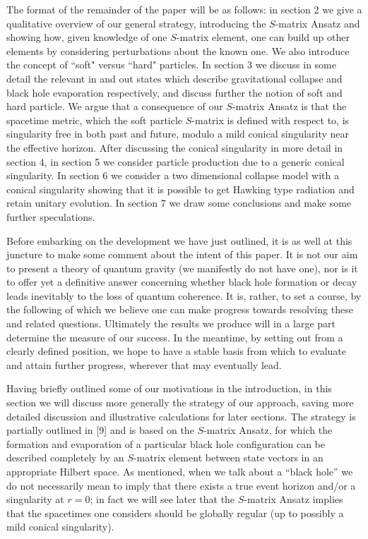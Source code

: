 The format of the remainder of the paper will be as follows: in section
2 we give a qualitative overview of our general strategy, introducing
the $S$-matrix Ansatz and showing how, given knowledge of one
$S$-matrix element, one can build up other elements by considering
perturbations about the known one. We also introduce the concept of
``soft" versus ``hard" particles. In section 3 we discuss in some
detail the relevant in and out states which describe gravitational
collapse and black hole evaporation respectively, and discuss further
the notion of soft and hard particle. We argue that a consequence of
our $S$-matrix Ansatz is that the spacetime metric, which the soft
particle $S$-matrix is defined with respect to, is singularity free in
both past and future, modulo a mild conical singularity near the
effective horizon.  After discussing the conical singularity in more
detail in section 4, in section 5 we consider particle production due
to a generic conical singularity. In section 6 we consider a two
dimensional collapse model with a conical singularity showing that it
is possible to get Hawking type radiation and retain unitary evolution.
In section 7 we draw some conclusions and make some further
speculations.

Before embarking on the development we have just outlined, it is as
well at this juncture to make some comment about the intent of this
paper. It is not our aim to present a theory of quantum gravity (we
manifestly do not have one), nor is it to offer yet a definitive answer
concerning whether black hole formation or decay leads inevitably to
the loss of quantum coherence.  It is, rather, to set a course, by the
following of which we believe one can make progress towards resolving
these and related questions. Ultimately the results we produce will in
a large part determine the measure of our success. In the meantime, by
setting out from a clearly defined position, we hope to have a stable
basis from which to evaluate and attain further progress, wherever that
may eventually lead.

\bigskip
\par{}
\medskip
Having briefly outlined some of our motivations in the introduction, in
this section we will discuss more generally the strategy of our
approach, saving more detailed discussion and illustrative calculations
for later sections. The strategy is partially outlined in [9] and is
based on the $S$-matrix Ansatz, for which the formation and evaporation
of a particular black hole configuration can be described completely
by an $S$-matrix element between state vectors in an appropriate Hilbert
space. As mentioned, when we talk about a ``black hole'' we do not
necessarily mean to imply that there exists a true event horizon and/or
a singularity at $r=0$; in fact we will see later that the $S$-matrix
Ansatz implies that the spacetimes one considers should be globally
regular (up to possibly a mild conical singularity).

